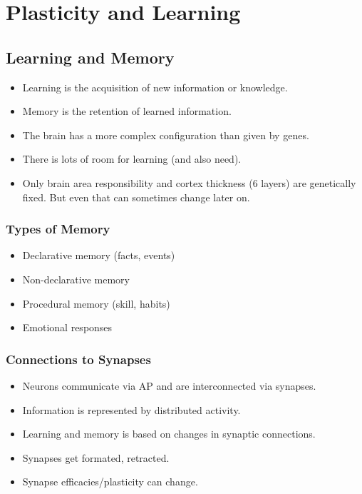 \documentclass[main]{subfiles}
\begin{document}

\section{Plasticity and Learning}
\subsection{Learning and Memory}
\begin{itemize}[noitemsep,nolistsep]
	\item Learning is the acquisition of new information or knowledge.
	\item Memory is the retention of learned information.
	\item The brain has a more complex configuration than given by genes.
	\item There is lots of room for learning (and also need).
	\item Only brain area responsibility and cortex thickness (6 layers) are genetically fixed. But even that can sometimes change later on.
\end{itemize}

\subsubsection{Types of Memory}
\begin{itemize}[noitemsep,nolistsep]
	\item Declarative memory (facts, events)
	\item Non-declarative memory
	\item Procedural memory (skill, habits)
	\item Emotional responses
\end{itemize}

\subsubsection{Connections to Synapses}
\begin{itemize}[noitemsep,nolistsep]
	\item Neurons communicate via AP and are interconnected via synapses.
	\item Information is represented by distributed activity.
	\item Learning and memory is based on changes in synaptic connections.
	\item Synapses get formated, retracted.
	\item Synapse efficacies/plasticity can change.
\end{itemize}
\end{document}
